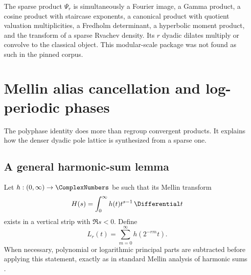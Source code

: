 \documentclass[11pt]{article}
\theoremstyle{definition}
\theoremstyle{remark}
\begin{document}
\begin{resultboxPartiv}
The sparse product $\Psi_r$ is simultaneously a Fourier image, a Gamma product,
a cosine product with staircase exponents, a canonical product with quotient
valuation multiplicities, a Fredholm determinant, a hyperbolic moment product,
and the transform of a sparse Rvachev density.  Its $r$ dyadic dilates multiply
or convolve to the classical object.  This modular-scale package was not found
as such in the pinned corpus.
\end{resultboxPartiv}

\section{Mellin alias cancellation and log-periodic phases}
\label{p5:sec:mellin-polyphase}

The polyphase identity does more than regroup convergent products.  It explains
how the denser dyadic pole lattice is synthesized from a sparse one.

\subsection{A general harmonic-sum lemma}

Let $h:(0,\infty)\to\ComplexNumbers$ be such that its Mellin transform
\begin{equation}
 H(s)=\int_0^{\infty}h(t)t^{s-1}\,\Differential t                     \label{p5:eq:H-Mellin}
\end{equation}
exists in a vertical strip with $\Re s<0$.  Define
\begin{equation}
 L_r(t)=\sum_{m=0}^{\infty}h(2^{-rm}t).                     \label{p5:eq:Lr-harmonic}
\end{equation}
When necessary, polynomial or logarithmic principal parts are subtracted before
applying this statement, exactly as in standard Mellin analysis of harmonic
sums \cite{p5:flajolet1995}.
\end{document}
